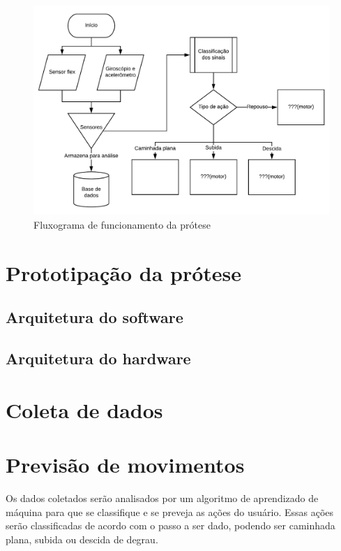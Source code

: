 \begin{figure}[h]
	\caption{\label{fig:flowchart}Fluxograma de funcionamento da prótese}
	\begin{center}
	    \includegraphics[width=\textwidth]{resources/flowchart}
	\end{center}
\end{figure}

\section{Prototipação da prótese}
\subsection{Arquitetura do software}
\subsection{Arquitetura do hardware}

\section{Coleta de dados}

\section{Previsão de movimentos}
Os dados coletados serão analisados por um algoritmo de aprendizado de máquina para que se classifique e se preveja as ações do usuário. Essas ações serão classificadas de acordo com o passo a ser dado, podendo ser caminhada plana, subida ou descida de degrau.

